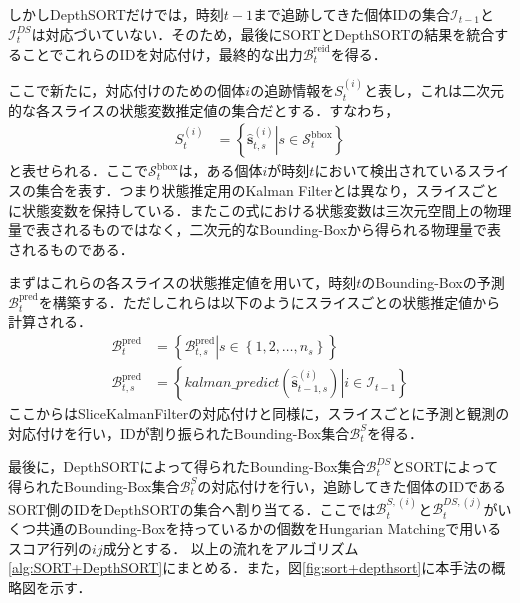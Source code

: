     しかしDepthSORTだけでは，時刻$t-1$まで追跡してきた個体IDの集合$\mathcal{I}_{t-1}$と$\mathcal{I}_t^{DS}$は対応づいていない．そのため，最後にSORTとDepthSORTの結果を統合することでこれらのIDを対応付け，最終的な出力$\mathcal{B}_t^{\text{reid}}$を得る．
    \par
    ここで新たに，対応付けのための個体$i$の追跡情報を$S_t^{(i)}$と表し，これは二次元的な各スライスの状態変数推定値の集合だとする．すなわち，
    \begin{equation}
        \begin{aligned}
            S_t^{(i)} &= \left\{\left.\hat{\bm{s}}_{t,s}^{(i)}\right| s \in \mathcal{S}^{\text{bbox}}_t\right\}
        \end{aligned}
    \end{equation}
    と表せられる．ここで$\mathcal{S}_t^{\text{bbox}}$は，ある個体$i$が時刻$t$において検出されているスライスの集合を表す．つまり状態推定用のKalman Filterとは異なり，スライスごとに状態変数を保持している．またこの式における状態変数は三次元空間上の物理量で表されるものではなく，二次元的なBounding-Boxから得られる物理量で表されるものである．
    \par
    まずはこれらの各スライスの状態推定値を用いて，時刻$t$のBounding-Boxの予測$\mathcal{B}_t^{\text{pred}}$を構築する．ただしこれらは以下のようにスライスごとの状態推定値から計算される．
    \begin{equation}
        \begin{aligned}
            \mathcal{B}_t^{\text{pred}} &= \left\{\left.\mathcal{B}_{t,s}^{\text{pred}}\right|s \in \left\{1,2,\dots,n_s\right\}\right\}
            \\ \mathcal{B}_{t,s}^{\text{pred}} &= \left\{\left.kalman\_predict(\hat{\bm{s}}_{t-1,s}^{(i)})\right|i \in \mathcal{I}_{t-1}\right\}
        \end{aligned}
    \end{equation}
    ここからはSliceKalmanFilterの対応付けと同様に，スライスごとに予測と観測の対応付けを行い，IDが割り振られたBounding-Box集合$\mathcal{B}_t^{S}$を得る．
    \par
    最後に，DepthSORTによって得られたBounding-Box集合$\mathcal{B}_t^{DS}$とSORTによって得られたBounding-Box集合$\mathcal{B}_t^{S}$の対応付けを行い，追跡してきた個体のIDであるSORT側のIDをDepthSORTの集合へ割り当てる．ここでは$\mathcal{B}_t^{S, (i)}$と$\mathcal{B}_t^{DS, (j)}$がいくつ共通のBounding-Boxを持っているかの個数をHungarian Matchingで用いるスコア行列の$ij$成分とする．
    以上の流れをアルゴリズム\ref{alg:SORT+DepthSORT}にまとめる．また，図\ref{fig:sort+depthsort}に本手法の概略図を示す．


